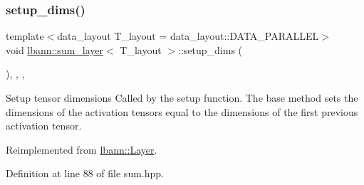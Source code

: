 \mbox{\label{classlbann_1_1sum__layer_af7e011a8e1cd89cc9f9c0224182bfb7a}} 
\subsubsection{\texorpdfstring{setup\+\_\+dims()}{setup\_dims()}}
{\footnotesize\ttfamily template$<$data\+\_\+layout T\+\_\+layout = data\+\_\+layout\+::\+D\+A\+T\+A\+\_\+\+P\+A\+R\+A\+L\+L\+EL$>$ \\
void \hyperlink{classlbann_1_1sum__layer}{lbann\+::sum\+\_\+layer}$<$ T\+\_\+layout $>$\+::setup\+\_\+dims (\begin{DoxyParamCaption}{ }\end{DoxyParamCaption})\hspace{0.3cm}{\ttfamily [inline]}, {\ttfamily [override]}, {\ttfamily [protected]}, {\ttfamily [virtual]}}

Setup tensor dimensions Called by the setup function. The base method sets the dimensions of the activation tensors equal to the dimensions of the first previous activation tensor. 

Reimplemented from \hyperlink{classlbann_1_1Layer_a90fce1b06c1f2abb480e18cfe08a9746}{lbann\+::\+Layer}.



Definition at line 88 of file sum.\+hpp.


